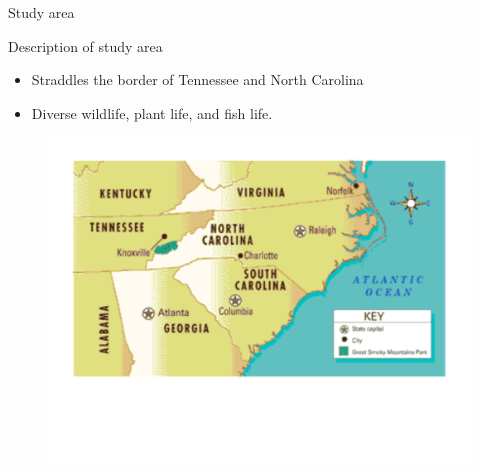 \begin{frame}{Study area}

\begin{block}{Description of study area}
	\begin{itemize}
		\item Straddles the border of Tennessee and North Carolina
		\item Diverse wildlife, plant life, and fish life.
	\end{itemize}
\end{block}
 
\begin{figure}
\centering			
\includegraphics[width=.85\textwidth]{Figures/Parklocation2}
\end{figure}
		
\end{frame}